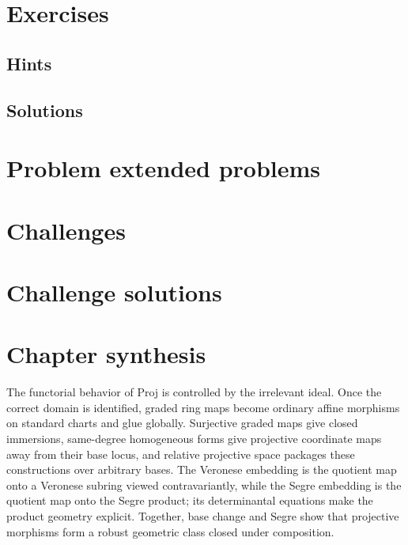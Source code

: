 \section{Exercises}


\ifdefined\IncludeExerciseHints
\subsection*{Hints}

\fi

\ifdefined\IncludeExerciseSolutions
\subsection*{Solutions}

\fi

\section{Problem extended problems}


\section{Challenges}


\ifdefined\IncludeChallengeSolutions
\section{Challenge solutions}

\fi

\section*{Chapter synthesis}
The functorial behavior of Proj is controlled by the irrelevant ideal.  Once the correct domain is identified, graded ring maps become ordinary affine morphisms on standard charts and glue globally.  Surjective graded maps give closed immersions, same-degree homogeneous forms give projective coordinate maps away from their base locus, and relative projective space packages these constructions over arbitrary bases.  The Veronese embedding is the quotient map onto a Veronese subring viewed contravariantly, while the Segre embedding is the quotient map onto the Segre product; its determinantal equations make the product geometry explicit.  Together, base change and Segre show that projective morphisms form a robust geometric class closed under composition.
